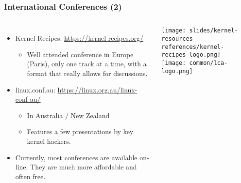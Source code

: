 \begin{frame}
  \frametitle{International Conferences (2)}
  \begin{columns}
    \begin{itemize}
      \item Kernel Recipes: \url{https://kernel-recipes.org/}
      \begin{itemize}
      \item Well attended conference in Europe (Paris), only one track
        at a time, with a format that really allows for discussions.
    \end{itemize}
    \item linux.conf.au: \url{https://linux.org.au/linux-conf-au/}
      \begin{itemize}
      \item In Australia / New Zealand
      \item Features a few presentations by key kernel hackers.
      \end{itemize}
    \item Currently, most conferences are available on-line. They
	  are much more affordable and often free.
  \end{itemize}
     \texttt{[image: slides/kernel-resources-references/kernel-recipes-logo.png]}\\
     \vspace{1cm}
     \texttt{[image: common/lca-logo.png]}
  \end{columns}
\end{frame}

